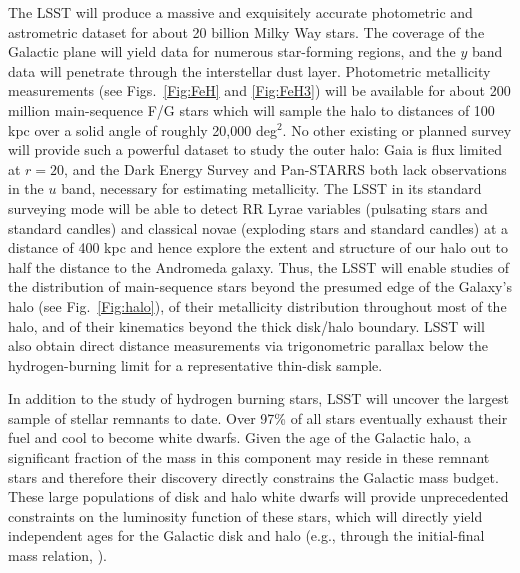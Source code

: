 The LSST will produce a massive and exquisitely accurate photometric and astrometric dataset for about 20 billion
Milky Way stars. The coverage of the Galactic plane will yield data for numerous star-forming
regions, and the $y$ band data will penetrate through the interstellar dust layer. Photometric metallicity
measurements (see Figs.~\ref{Fig:FeH} and \ref{Fig:FeH3}) will be available for about 200 million main-sequence
F/G stars which will sample the halo to distances of 100 kpc
\citep{2008ApJ...684..287I,2013ApJ...763...65A} over a solid angle of
roughly 20,000 deg$^2$. No other
existing or planned survey will provide such a powerful dataset to
study the outer halo: Gaia
is flux limited at $r=20$, and the Dark Energy Survey \citep{2011AJ....141..185R} and Pan-STARRS both
lack observations in the $u$ band, necessary for estimating metallicity. The LSST in its standard surveying mode will
be able to detect RR Lyrae variables (pulsating stars and standard candles) and classical novae (exploding stars
and standard candles) at a distance of 400 kpc and hence explore the extent and structure of our  halo out to
half the distance to the Andromeda galaxy. Thus, the LSST will enable studies of the distribution of main-sequence
stars beyond the presumed edge of the Galaxy's halo (see Fig.~\ref{Fig:halo}), of their metallicity distribution
throughout most of the halo, and of their kinematics beyond the thick disk/halo boundary. LSST will also obtain
direct distance measurements via trigonometric parallax below the hydrogen-burning limit for a representative
thin-disk sample.


In addition to the study of hydrogen burning stars, LSST will uncover the largest sample of stellar remnants to date.
Over 97\% of all stars eventually exhaust their fuel and cool to become white dwarfs. Given the age of the Galactic
halo, a significant fraction of the mass in this component may reside in these remnant stars
\citep[e.g.,][]{2000ApJ...542..281A,2007A&A...469..387T}
and therefore their discovery directly constrains the Galactic mass budget.  These large
populations of disk and halo white dwarfs will provide unprecedented constraints on the luminosity function of
these stars, which will directly yield independent ages for the Galactic disk and halo (e.g., through the initial-final mass
relation, \citet{2008ApJ...676..594K}).


